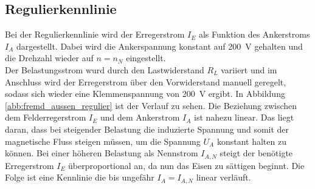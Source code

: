 \subsection{Regulierkennlinie}
Bei der Regulierkennlinie wird der Erregerstrom $I_E$ als Funktion des Ankerstroms $I_A$ dargestellt. Dabei wird die Ankerspannung konstant auf \SI{200}{\volt} gehalten und die Drehzahl wieder auf $n=n_N$ eingestellt.\\
Der Belastungsstrom wurd durch den Lastwiderstand $R_L$ variiert und im Anschluss wird der Erregerstrom über den Vorwiderstand manuell geregelt, sodass sich wieder eine Klemmenspannung von \SI{200}{\volt} ergibt. In Abbildung \ref{abb:fremd_aussen_regulier} ist der Verlauf zu sehen. Die Beziehung zwischen dem Felderregerstrom $I_E$ und dem Ankerstrom $I_A$ ist nahezu linear. Das liegt daran, dass bei steigender Belastung die induzierte Spannung und somit der magnetische Fluss steigen müssen, um die Spannung $U_A$ konstant halten zu können. Bei einer höheren Belastung als Nennstrom $I_{A,N}$ steigt der benötigte Erregerstrom $I_E$ überproportional an, da nun das Eisen zu sättigen beginnt. Die Folge ist eine Kennlinie die bis ungefähr $I_A = I_{A,N}$ linear verläuft.



%